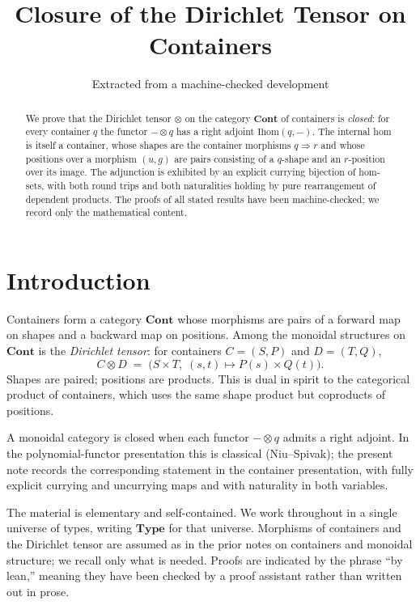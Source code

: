 \documentclass[11pt,a4paper]{article}
\title{Closure of the Dirichlet Tensor on Containers}
\author{Extracted from a machine-checked development}
\date{}
\theoremstyle{plain}
\theoremstyle{definition}
\newcommand{\Type}{\mathbf{Type}}
\newcommand{\Ihom}{\mathrm{Ihom}}
\newcommand{\Cont}{\mathbf{Cont}}
\begin{document}
\maketitle

\begin{abstract}
We prove that the Dirichlet tensor $\otimes$ on the category $\Cont$ of
containers is \emph{closed}: for every container $q$ the functor
$- \otimes q$ has a right adjoint $\Ihom(q,-)$. The internal hom is itself
a container, whose shapes are the container morphisms $q \Rightarrow r$ and
whose positions over a morphism $(u,g)$ are pairs consisting of a $q$-shape
and an $r$-position over its image. The adjunction is exhibited by an
explicit currying bijection of hom-sets, with both round trips and both
naturalities holding by pure rearrangement of dependent products. The proofs
of all stated results have been machine-checked; we record only the
mathematical content.
\end{abstract}

\tableofcontents
\bigskip

\section{Introduction}

Containers form a category $\Cont$ whose morphisms are pairs of a forward
map on shapes and a backward map on positions. Among the monoidal structures
on $\Cont$ is the \emph{Dirichlet tensor}: for containers $C = (S,P)$ and
$D = (T,Q)$,
\begin{equation}
  C \otimes D \;=\; \bigl(S \times T,\; (s,t) \mapsto P(s) \times Q(t)\bigr).
\end{equation}
Shapes are paired; positions are products. This is dual in spirit to the
categorical product of containers, which uses the same shape product but
coproducts of positions.

A monoidal category is closed when each functor $- \otimes q$ admits a
right adjoint. In the polynomial-functor presentation this is classical
(Niu--Spivak); the present note records the corresponding statement in the
container presentation, with fully explicit currying and uncurrying maps
and with naturality in both variables.

The material is elementary and self-contained. We work throughout in a
single universe of types, writing $\Type$ for that universe. Morphisms of
containers and the Dirichlet tensor are assumed as in the prior notes on
containers and monoidal structure; we recall only what is needed. Proofs
are indicated by the phrase ``by lean,'' meaning they have been checked by
a proof assistant rather than written out in prose.
\end{document}
